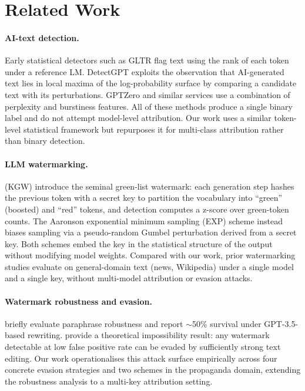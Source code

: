 \documentclass[11pt]{article}
\begin{document}
\section{Related Work}
\label{sec:related}

\paragraph{AI-text detection.}
Early statistical detectors such as GLTR \cite{gehrmann2019gltr} flag text
using the rank of each token under a reference LM.
DetectGPT \cite{mitchell2023detectgpt} exploits the observation that
AI-generated text lies in local maxima of the log-probability surface by
comparing a candidate text with its perturbations.
GPTZero and similar services use a combination of perplexity and burstiness
features.
All of these methods produce a single binary label and do not attempt
model-level attribution.
Our work uses a similar token-level statistical framework but repurposes it
for multi-class attribution rather than binary detection.

\paragraph{LLM watermarking.}
\citet{kirchenbauer2023watermark} (KGW) introduce the seminal green-list
watermark: each generation step hashes the previous token with a secret key
to partition the vocabulary into ``green'' (boosted) and ``red'' tokens, and
detection computes a z-score over green-token counts.
The Aaronson exponential minimum sampling (EXP) scheme
\cite{aaronson2022watermark} instead biases sampling via a pseudo-random
Gumbel perturbation derived from a secret key.
Both schemes embed the key in the statistical structure of the output without
modifying model weights.
Compared with our work, prior watermarking studies evaluate on general-domain
text (news, Wikipedia) under a single model and a single key, without
multi-model attribution or evasion attacks.

\paragraph{Watermark robustness and evasion.}
\citet{kirchenbauer2023watermark} briefly evaluate paraphrase robustness and
report $\sim$50\% survival under GPT-3.5-based rewriting.
\citet{sadasivan2023aigenerated} provide a theoretical impossibility result:
any watermark detectable at low false positive rate can be evaded by
sufficiently strong text editing.
Our work operationalises this attack surface empirically across four
concrete evasion strategies and two schemes in the propaganda domain, extending
the robustness analysis to a multi-key attribution setting.
\end{document}
